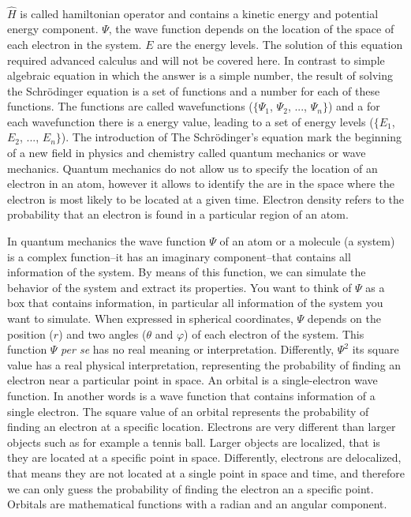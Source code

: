 \documentclass[main.tex]{subfiles}
\begin{document}
\begin{description}
\begin{equation*}
\begin{split}
\end{split}\end{equation*}
$\hat{H}$ is called hamiltonian operator and contains a kinetic energy and potential energy component. $\Psi$, the wave function depends on the location of the space of each electron in the system. $E$ are the energy levels. The solution of this equation required advanced calculus and will not be covered here. In contrast to simple algebraic equation in which the answer is a simple number, the result of solving the Schr\"{o}dinger equation is a set of functions and a number for each of these functions. The functions are called wavefunctions ($\{\Psi_1$, $\Psi_2$, ..., $\Psi_n\}$) and a for each wavefunction there is a energy value, leading to a set of energy levels ($\{E_1$, $E_2$, ..., $E_n\}$).
The introduction of The Schr\"{o}dinger's equation mark the beginning of a new field in physics and chemistry called quantum mechanics or wave mechanics. Quantum mechanics do not allow us to specify the location of an electron in an atom, however it allows to identify the are in the space where the electron is most likely to be located at a given time. Electron density refers to the probability that an electron is found in a particular region of an atom.
\item[\docfilehook{The wave function: orbitals}{}] 
In quantum mechanics the wave function $\Psi$ of an atom or a molecule (a system) is a complex function--it has an imaginary component--that contains all information of the system. By means of this function, we can simulate the behavior of the system and extract its properties. You want to think of $\Psi$ as a box that contains information, in particular all information of the system you want to simulate. When expressed in spherical coordinates, $\Psi$ depends on the position ($r$) and two angles ($\theta$ and $\varphi$) of each electron of the system. This function $\Psi$ \emph{per se} has no real meaning or interpretation. Differently, $\Psi^2$
its square value has a real physical interpretation, representing the probability of finding an electron near a particular point in space. An orbital is a single-electron wave function. In another words is a wave function that contains information of a single electron. The square value of an orbital represents the probability of finding an electron at a specific location. Electrons are very different than larger objects such as for example a tennis ball. Larger objects are localized, that is they are located at a specific point in space. Differently, electrons are delocalized, that means they are not located at a single point in space and time, and therefore we can only guess the probability of finding the electron an a specific point. Orbitals are mathematical functions with a radian and an angular component.

\end{description}
\end{document}
